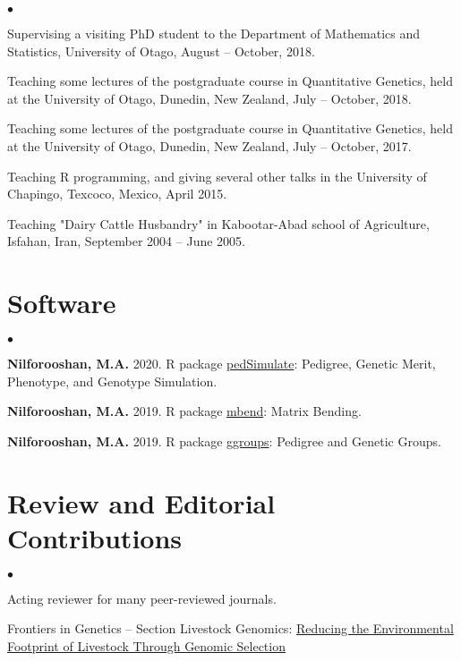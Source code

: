 \documentclass[margin,line]{res}
\newenvironment{list2}{
  \begin{list}{$\bullet$}{%
      \setlength{\itemsep}{0in}
      \setlength{\parsep}{0in} \setlength{\parskip}{0in}
      \setlength{\topsep}{0in} \setlength{\partopsep}{0in}
      \setlength{\leftmargin}{0.2in}}}{\end{list}}
\begin{document}
\begin{resume}
\begin{list2}
\item Supervising a visiting PhD student to the Department of Mathematics and Statistics, University of Otago, August -- October, 2018.
\item Teaching some lectures of the postgraduate course in Quantitative Genetics, held at the University of Otago, Dunedin, New Zealand, July -- October, 2018.
\item Teaching some lectures of the postgraduate course in Quantitative Genetics, held at the University of Otago, Dunedin, New Zealand, July -- October, 2017.
\item Teaching R programming, and giving several other talks in the University of Chapingo, Texcoco, Mexico, April 2015.
\item Teaching "Dairy Cattle Husbandry" in Kabootar-Abad school of Agriculture, Isfahan, Iran, September 2004 -- June 2005.
\end{list2}
\section{\sc Software}

\begin{list2}
\item {\bf Nilforooshan, M.A.} 2020. R package \href{https://CRAN.R-project.org/package=pedSimulate}{pedSimulate}: Pedigree, Genetic Merit, Phenotype, and Genotype Simulation. \\
\item {\bf Nilforooshan, M.A.} 2019. R package \href{https://CRAN.R-project.org/package=mbend}{mbend}: Matrix Bending. \\
\item {\bf Nilforooshan, M.A.} 2019. R package \href{https://CRAN.R-project.org/package=ggroups}{ggroups}: Pedigree and Genetic Groups.
\end{list2}
\section{\sc Review and Editorial Contributions}

\begin{list2}
\item Acting reviewer for many peer-reviewed journals.
\item Frontiers in Genetics -- Section Livestock Genomics: \href{https://www.frontiersin.org/research-topics/24065/reducing-the-environmental-footprint-of-livestock-through-genomic-selection}{Reducing the Environmental Footprint of Livestock Through Genomic Selection}
\end{list2}

\end{resume}
\end{document}
